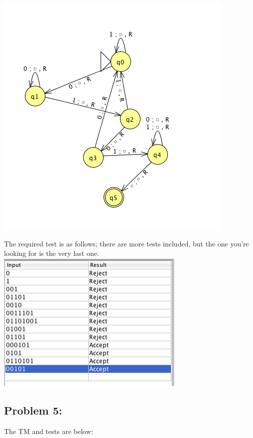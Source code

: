 \documentclass[a4paper]{article}
\begin{document}
\includegraphics[scale=0.6]{p4_TM.png}

The required test is as follows; there are more tests included, but the one you're looking for is the very last one. \\

\includegraphics[scale=0.6]{p4_validation.png}

\subsection*{Problem 5:}

The TM and tests are below:
\end{document}
